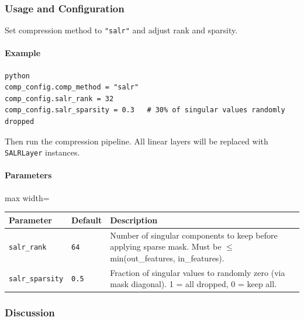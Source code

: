 \subsubsection*{Usage and Configuration}

Set compression method to \texttt{"salr"} and adjust rank and sparsity.

\paragraph{Example}

\vspace{0.5em}
\begin{mdframed}[backgroundcolor=codebg, linecolor=codeframe, linewidth=1pt, roundcorner=4pt, innerleftmargin=2pt, innerrightmargin=5pt, innertopmargin=5pt, innerbottommargin=5pt]
\begin{lstlisting}
python
comp_config.comp_method = "salr"
comp_config.salr_rank = 32
comp_config.salr_sparsity = 0.3   # 30% of singular values randomly dropped
\end{lstlisting}
\end{mdframed}
\vspace{0.5em}

Then run the compression pipeline. All linear layers will be replaced with \texttt{SALRLayer} instances.

\paragraph{Parameters}

\begin{center}
\begin{adjustbox}{max width=\columnwidth}
\renewcommand{\arraystretch}{1.2}
\begin{tabular}{lll}
\toprule
Parameter & Default & Description \\
\midrule
\texttt{salr\_rank} & \texttt{64} & Number of singular components to keep before applying sparse mask. Must be $\le$ min(out\_features, in\_features). \\
\texttt{salr\_sparsity} & \texttt{0.5} & Fraction of singular values to randomly zero (via mask diagonal). 1 = all dropped, 0 = keep all. \\

\bottomrule
\end{tabular}
\end{adjustbox}
\end{center}

\subsubsection*{Discussion}

